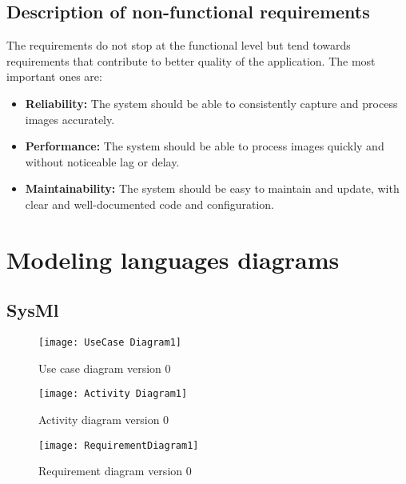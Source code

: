 \subsection{Description of non-functional requirements}
The requirements do not stop at the functional level but tend towards requirements that contribute to better quality of the application. The most important ones are:
\begin{itemize}
\item \textbf{Reliability:} The system should be able to consistently capture and process images accurately.
\item \textbf{Performance:} The system should be able to process images quickly and without noticeable lag or delay.
\item \textbf{Maintainability:} The system should be easy to maintain and update, with clear and well-documented code and configuration.
\end{itemize}

\section{Modeling languages diagrams}
\subsection{SysMl}

\FloatBarrier
\begin{figure}[h]
\FloatBarrier
         \centering
        \texttt{[image: UseCase Diagram1]}
   
        \caption{Use case diagram version 0}
        \label{Use case diagram version 0}
\FloatBarrier
    \end{figure}


\FloatBarrier

\FloatBarrier
\begin{figure}[h]
\FloatBarrier
         \centering
        \texttt{[image: Activity Diagram1]}
   
        \caption{Activity diagram version 0}
        \label{Activity diagram version 0}
\FloatBarrier
    \end{figure}


\FloatBarrier

\FloatBarrier
\begin{figure}[h]
\FloatBarrier
         \centering
        \texttt{[image: RequirementDiagram1]}
   
        \caption{Requirement diagram version 0}
        \label{Requirement diagram version 0}
\FloatBarrier
    \end{figure}


